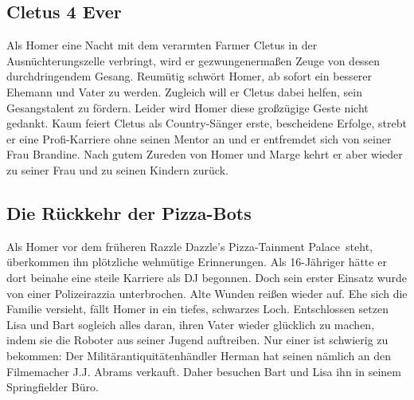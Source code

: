 \subsection{Cletus 4 Ever}
Als Homer eine Nacht mit dem verarmten Farmer Cletus in der Ausnüchterungszelle verbringt, wird er gezwungenermaßen Zeuge von dessen durchdringendem Gesang. Reumütig schwört Homer, ab sofort ein besserer Ehemann und Vater zu werden. Zugleich will er Cletus dabei helfen, sein Gesangstalent zu fördern. Leider wird Homer diese großzügige Geste nicht gedankt. Kaum feiert Cletus als Country-Sänger erste, bescheidene Erfolge, strebt er eine Profi-Karriere ohne seinen Mentor an und er entfremdet sich von seiner Frau Brandine. Nach gutem Zureden von Homer und Marge kehrt er aber wieder zu seiner Frau und zu seinen Kindern zurück.


\subsection{Die Rückkehr der Pizza-Bots}\label{QABF08}
Als Homer vor dem früheren \glqq Razzle Dazzle's Pizza-Tainment Palace\grqq\ steht, überkommen ihn plötzliche wehmütige Erinnerungen. Als 16-Jähriger hätte er dort beinahe eine steile Karriere als DJ begonnen. Doch sein erster Einsatz wurde von einer Polizeirazzia unterbrochen. Alte Wunden reißen wieder auf. Ehe sich die Familie versieht, fällt Homer in ein tiefes, schwarzes Loch. Entschlossen setzen Lisa und Bart sogleich alles daran, ihren Vater wieder glücklich zu machen, indem sie die Roboter aus seiner Jugend auftreiben. Nur einer ist schwierig zu bekommen: Der Militärantiquitätenhändler Herman hat seinen nämlich an den Filmemacher J.J. Abrams verkauft. Daher besuchen Bart und Lisa ihn in seinem Springfielder Büro.


